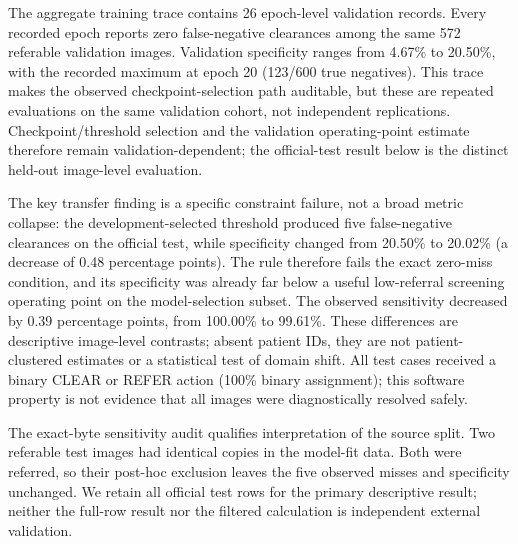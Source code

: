 \documentclass{ieeeaccess}
\begin{document}
The aggregate training trace contains 26 epoch-level validation records. Every recorded epoch reports zero false-negative clearances among the same 572 referable validation images. Validation specificity ranges from 4.67\% to 20.50\%, with the recorded maximum at epoch 20 (123/600 true negatives). This trace makes the observed checkpoint-selection path auditable, but these are repeated evaluations on the same validation cohort, not independent replications. Checkpoint/threshold selection and the validation operating-point estimate therefore remain validation-dependent; the official-test result below is the distinct held-out image-level evaluation.

The key transfer finding is a specific constraint failure, not a broad metric collapse: the development-selected threshold produced five false-negative clearances on the official test, while specificity changed from 20.50\% to 20.02\% (a decrease of 0.48 percentage points). The rule therefore fails the exact zero-miss condition, and its specificity was already far below a useful low-referral screening operating point on the model-selection subset. The observed sensitivity decreased by 0.39 percentage points, from 100.00\% to 99.61\%. These differences are descriptive image-level contrasts; absent patient IDs, they are not patient-clustered estimates or a statistical test of domain shift. All test cases received a binary CLEAR or REFER action (100\% binary assignment); this software property is not evidence that all images were diagnostically resolved safely.

The exact-byte sensitivity audit qualifies interpretation of the source split. Two referable test images had identical copies in the model-fit data. Both were referred, so their post-hoc exclusion leaves the five observed misses and specificity unchanged. We retain all official test rows for the primary descriptive result; neither the full-row result nor the filtered calculation is independent external validation.
\end{document}
